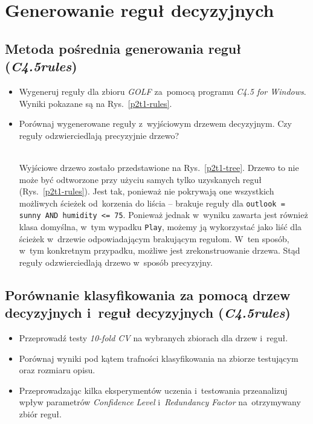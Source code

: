 
\section{Generowanie reguł decyzyjnych}

\subsection{Metoda pośrednia generowania reguł (\emph{C4.5rules})}

\begin{itemize}
\item Wygeneruj reguły dla zbioru \emph{GOLF} za~pomocą programu \emph{C4.5 for Windows}.
\\Wyniki pokazane są na Rys.~\ref{p2t1-rules}.
\item Porównaj wygenerowane reguły z~wyjściowym drzewem decyzyjnym. Czy reguły odzwierciedlają precyzyjnie drzewo?

\\Wyjściowe drzewo zostało przedstawione na Rys.~\ref{p2t1-tree}. Drzewo to nie może być odtworzone przy użyciu samych tylko uzyskanych reguł (Rys.~\ref{p2t1-rules}). Jest tak, ponieważ nie pokrywają one wszystkich możliwych ścieżek od~korzenia do liścia -- brakuje reguły dla \texttt{outlook = sunny AND humidity <= 75}. Ponieważ jednak w~wyniku zawarta jest również klasa domyślna, w~tym wypadku \texttt{Play}, możemy ją wykorzystać jako liść dla ścieżek w~drzewie odpowiadającym brakującym regułom. W~ten sposób, w~tym konkretnym przypadku, możliwe jest zrekonstruowanie drzewa. Stąd reguły odzwierciedlają drzewo w~sposób precyzyjny.
\end{itemize}

\subsection{Porównanie klasyfikowania za pomocą drzew decyzyjnych i~reguł decyzyjnych (\emph{C4.5rules})}

\begin{itemize}
\item Przeprowadź testy \emph{10-fold CV} na wybranych zbiorach dla drzew i~reguł.
\item Porównaj wyniki pod kątem trafności klasyfikowania na zbiorze testującym oraz rozmiaru opisu.
\item Przeprowadzając kilka eksperymentów uczenia i~testowania przeanalizuj wpływ parametrów \emph{Confidence Level} i~\emph{Redundancy Factor} na~otrzymywany zbiór reguł.
\end{itemize}


